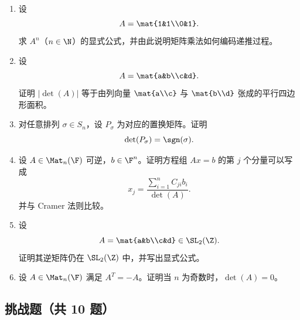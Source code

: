 \begin{enumerate}[label=\arabic*.,start=31]
  \item \medium 设
  \[
  A=\mat{1&1\\0&1}.
  \]
  求 $A^n$（$n\in\N$）的显式公式，并由此说明矩阵乘法如何编码递推过程。

  \item \medium 设
  \[
  A=\mat{a&b\\c&d}.
  \]
  证明 $|\det(A)|$ 等于由列向量 $\mat{a\\c}$ 与 $\mat{b\\d}$ 张成的平行四边形面积。

  \item \medium 对任意排列 $\sigma\in S_n$，设 $P_\sigma$ 为对应的置换矩阵。证明
  \[
  \det(P_\sigma)=\sgn(\sigma).
  \]

  \item \medium 设 $A\in\Mat_n(\F)$ 可逆，$b\in\F^n$。证明方程组 $Ax=b$ 的第 $j$ 个分量可以写成
  \[
  x_j=\frac{\sum_{i=1}^n C_{ji}b_i}{\det(A)}.
  \]
  并与 Cramer 法则比较。

  \item \medium 设
  \[
  A=\mat{a&b\\c&d}\in \SL_2(\Z).
  \]
  证明其逆矩阵仍在 $\SL_2(\Z)$ 中，并写出显式公式。

  \item \medium 设 $A\in\Mat_n(\F)$ 满足 $A^T=-A$。证明当 $n$ 为奇数时，$\det(A)=0$。
\end{enumerate}

\subsection*{挑战题（共 10 题）}

